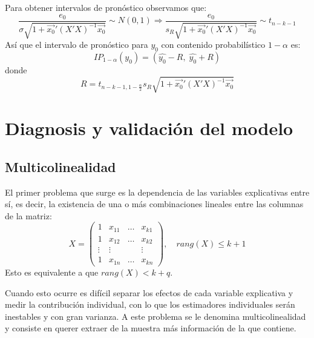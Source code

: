 \documentclass{report}
\theoremstyle{remark}
\theoremstyle{remark}
\theoremstyle{remark}
\theoremstyle{definition}
\theoremstyle{definition}
\theoremstyle{definition}
\begin{document}
Para obtener intervalos de pronóstico observamos que:
$$\frac{e_0}{\sigma\sqrt{1+\vec{x_0}'(X'X)^{-1}\vec{x_0}}} \sim N(0, 1) \Rightarrow \frac{e_0}{s_R\sqrt{1+\vec{x_0}'(X'X)^{-1}\vec{x_0}}} \sim t_{n-k-1}$$
Así que el intervalo de pronóstico para $y_0$ con contenido probabilístico $1-\alpha$ es:
$$IP_{1-\alpha}(y_0) = (\hat{y_0} - R, \; \hat{y_0} + R)$$
donde
$$R = t_{n-k-1, 1-\frac{\alpha}{2}} s_R\sqrt{1+\vec{x_0}'(X'X)^{-1}\vec{x_0}}$$

\section{Diagnosis y validación del modelo}
\subsection*{Multicolinealidad}
El primer problema que surge es la dependencia de las variables explicativas entre sí, es decir, la existencia de una o más combinaciones lineales entre las columnas de la matriz:
$$X = \begin{pmatrix}
        1      & x_{11} & \dots & x_{k1} \\
        1      & x_{12} & \dots & x_{k2} \\
        \vdots & \vdots &       & \vdots \\
        1      & x_{1n} & \dots & x_{kn}
    \end{pmatrix}, \quad rang(X) \leq k+1$$
Esto es equivalente a que $rang(X) < k+q$.

Cuando esto ocurre es difícil separar los efectos de cada variable explicativa y medir la contribución individual, con lo que los estimadores individuales serán inestables y con gran varianza.
A este problema se le denomina multicolinealidad y consiste en querer extraer de la muestra más información de la que contiene.
\end{document}
